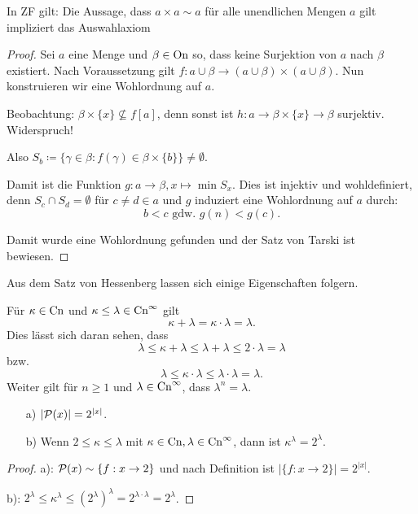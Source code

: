 \begin{satz}[Tarski, 1924]
	In ZF gilt: Die Aussage, dass $a\times a\sim a$ für alle unendlichen Mengen $a$ gilt impliziert das Auswahlaxiom
\end{satz}
\begin{proof}
	Sei $a$ eine Menge und $\beta\in \operatorname{On}$ so, dass keine Surjektion von $a$ nach $\beta$ existiert. Nach Voraussetzung gilt $f:a\cup \beta \to (a\cup \beta)\times(a\cup\beta)$. Nun konstruieren wir eine Wohlordnung auf $a$.
	
	Beobachtung: $\beta\times\{x\}\not\subseteq f[a]$, denn sonst ist $h:a\to \beta\times\{x\}\to \beta$ surjektiv. Widerspruch!
	
	Also $S_b\coloneqq\{\gamma\in\beta : f(\gamma)\in\beta\times\{b\}\}\neq\emptyset$.
	
	Damit ist die Funktion $g:a\to\beta, x\mapsto \min S_x$. Dies  ist injektiv und wohldefiniert, denn $S_c\cap S_d=\emptyset$ für $c\neq d\in a$ und $g$ induziert eine Wohlordnung auf $a$ durch:
	$$b<c\text{ gdw. } g(n)<g(c).$$

	Damit wurde eine Wohlordnung gefunden und der Satz von Tarski ist bewiesen.
\end{proof}

Aus dem Satz von Hessenberg lassen sich einige Eigenschaften folgern.

Für $\kappa\in \operatorname{Cn}$ und $\kappa\leq\lambda\in \operatorname{Cn}^\infty$ gilt $$\kappa+\lambda=\kappa\cdot\lambda=\lambda.$$
Dies lässt sich daran sehen, dass $$\lambda \leq \kappa+\lambda\leq\lambda+\lambda \leq 2\cdot\lambda =\lambda$$ bzw. $$\lambda \leq \kappa\cdot\lambda \leq \lambda\cdot\lambda = \lambda.$$
Weiter gilt für $n\geq 1$ und $\lambda \in \operatorname{Cn}^\infty$, dass $\lambda^n=\lambda$.

\begin{satz}
	\begin{itemize}
		\item[a)] $\vert \mathcal{P}(x) \vert = 2^{\vert x \vert}$.
		\item[b)] Wenn $2\leq \kappa \leq \lambda$ mit $\kappa\in \operatorname{Cn}, \lambda\in \operatorname{Cn}^\infty$, dann ist $\kappa^\lambda=2^\lambda$.
	\end{itemize}
\end{satz}
\begin{proof}
		a): $\mathcal{P}(x)\sim\{f:x\to2\}$ und nach Definition ist $\vert\{f:x\to 2\}\vert=2^{\vert x \vert}$.
		
		b): $2^\lambda \leq \kappa^\lambda \leq (2^\lambda)^\lambda = 2^{\lambda\cdot\lambda}=2^\lambda$.
\end{proof}

